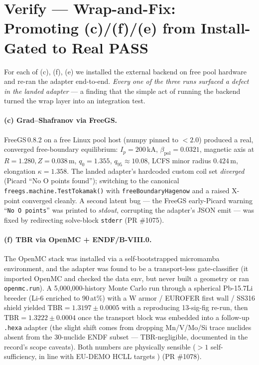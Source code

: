\documentclass[11pt,a4paper]{article}
\begin{document}
\section{Verify --- Wrap-and-Fix: Promoting (c)/(f)/(e) from Install-Gated to Real PASS}
\label{sec:promote}

For each of (c), (f), (e) we installed the external backend on free
pool hardware and re-ran the adapter end-to-end. \emph{Every one of
the three runs surfaced a defect in the landed adapter} --- a finding
that the simple act of running the backend turned the wrap layer
into an integration test.

\paragraph{(c) Grad--Shafranov via FreeGS.} FreeGS\,0.8.2 on a free
Linux pool host (numpy pinned to $<\!2.0$) produced a real, converged
free-boundary equilibrium: $I_p=200$\,kA, $\beta_{\text{pol}}=0.0321$,
magnetic axis at $R=1.280, Z=0.038$\,m, $q_0=1.355$, $q_{95}\approx
10.08$, LCFS minor radius $0.424$\,m, elongation $\kappa=1.358$. The
landed adapter's hardcoded custom coil set \emph{diverged} (Picard
``No O points found''); switching to the canonical
\verb|freegs.machine.TestTokamak()| with \verb|freeBoundaryHagenow|
and a raised X-point converged cleanly. A second latent bug --- the
FreeGS early-Picard warning ``\texttt{No O points}'' was printed to
\emph{stdout}, corrupting the adapter's JSON emit --- was fixed by
redirecting solve-block \texttt{stderr} (PR \#1075).

\paragraph{(f) TBR via OpenMC + ENDF/B-VIII.0.} The OpenMC stack was
installed via a self-bootstrapped micromamba environment, and the
adapter was found to be a transport-less gate-classifier (it
imported OpenMC and checked the data env, but never built a geometry
or ran \verb|openmc.run|). A 5{,}000{,}000-history Monte Carlo run
through a spherical Pb-15.7Li breeder (Li-6 enriched to 90\,at\%)
with a W armor / EUROFER first wall / SS316 shield yielded
$\text{TBR} = 1.3197 \pm 0.0005$ with a reproducing 13-sig-fig
re-run, then $\text{TBR} = 1.3222 \pm 0.0004$ once the transport
block was embedded into a follow-up \verb|.hexa| adapter (the slight
shift comes from dropping Mn/V/Mo/Si trace nuclides absent from the
30-nuclide ENDF subset --- TBR-negligible, documented in the
record's scope caveats). Both numbers are physically sensible
($>1$ self-sufficiency, in line with EU-DEMO HCLL targets
\citep{fischer2019eudemoTBR}) (PR \#1078).
\end{document}
